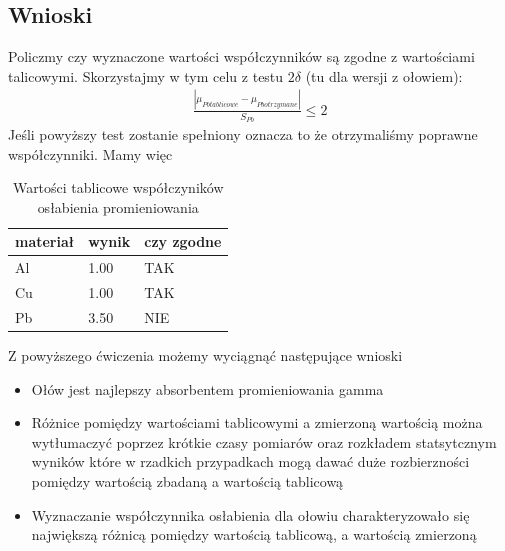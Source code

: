 \documentclass[a4paper]{article}
\newlength{\du}
\begin{document}
\subsection{Wnioski}
Policzmy czy wyznaczone wartości współczynników są zgodne z wartościami talicowymi. Skorzystajmy w tym celu z testu $2\delta$ (tu dla wersji z ołowiem):
\begin{align*}
\frac{|\mu_{Pb tablicowe} - \mu_{Pb otrzymane}|}{S_{Pb}} \leq 2
\end{align*}
Jeśli powyższy test zostanie spełniony oznacza to że otrzymaliśmy poprawne współczynniki.
Mamy więc
\begin{table}[h!]
\centering
\begin{tabular}{ | l | l | l | }
\hline
materiał & wynik & czy zgodne \\ \hline
Al & 1.00 & TAK \\ \hline  
Cu & 1.00 & TAK \\ \hline  
Pb & 3.50 & NIE \\ \hline  
\end{tabular}
\caption{Wartości tablicowe współczyników osłabienia promieniowania}
\label{pomiary_sruba}
\end{table}
Z powyższego ćwiczenia możemy wyciągnąć następujące wnioski
\begin{itemize}
\item Ołów jest najlepszy absorbentem promieniowania gamma
\item Różnice pomiędzy wartościami tablicowymi a zmierzoną wartością można wytłumaczyć poprzez krótkie czasy pomiarów oraz rozkładem statsytcznym wyników które w rzadkich przypadkach mogą dawać duże rozbierzności pomiędzy wartością zbadaną a wartością tablicową
\item Wyznaczanie współczynnika osłabienia dla ołowiu charakteryzowało się największą różnicą pomiędzy wartością tablicową, a wartością zmierzoną
\end{itemize}
\end{document}
